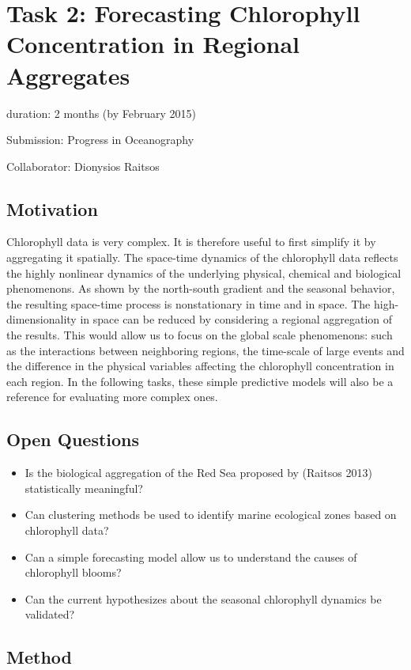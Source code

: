 \section{Task 2:  Forecasting Chlorophyll Concentration in Regional Aggregates}

duration: 2 months (by February 2015)

Submission: Progress in Oceanography

Collaborator: Dionysios Raitsos

\subsection{Motivation}

Chlorophyll data is very complex. It is therefore useful to first simplify it by aggregating it spatially. The space-time dynamics of the chlorophyll data reflects the highly nonlinear dynamics of the underlying physical, chemical and biological phenomenons. As shown by the north-south gradient and the seasonal behavior, the resulting space-time process is nonstationary in time and in space. The high-dimensionality in space can be reduced by considering a regional aggregation of the results. This would allow us to focus on the global scale phenomenons: such as the interactions between neighboring regions, the time-scale of large events and the difference in the physical variables affecting the chlorophyll concentration in each region. In the following tasks, these simple predictive models will also be a reference for evaluating more complex ones. 

\subsection{Open Questions}

\begin{itemize}
\item Is the biological aggregation of the Red Sea proposed by (Raitsos 2013) statistically meaningful?
\item Can clustering methods be used to identify marine ecological zones based on chlorophyll data?
\item Can a simple forecasting model allow us to understand the causes of chlorophyll blooms?
\item Can the current hypothesizes about the seasonal chlorophyll dynamics be validated?
\end{itemize}

\subsection{Method}

